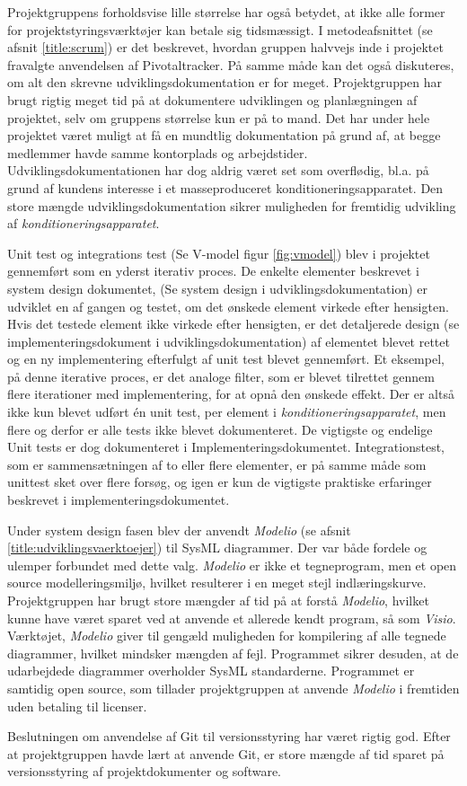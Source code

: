 Projektgruppens forholdsvise lille størrelse har også betydet, at ikke alle former for projektstyringsværktøjer kan betale sig tidsmæssigt. I metodeafsnittet (se afsnit \ref{title:scrum}) er det beskrevet, hvordan gruppen halvvejs inde i projektet fravalgte anvendelsen af Pivotaltracker. På samme måde kan det også diskuteres, om alt den skrevne udviklingsdokumentation er for meget. Projektgruppen har brugt rigtig meget tid på at dokumentere udviklingen og planlægningen af projektet, selv om gruppens størrelse kun er på to mand. Det har under hele projektet været muligt at få en mundtlig dokumentation på grund af, at begge medlemmer havde samme kontorplads og arbejdstider.
Udviklingsdokumentationen har dog aldrig været set som overflødig, bl.a. på grund af kundens interesse i et masseproduceret konditioneringsapparatet. Den store mængde udviklingsdokumentation sikrer muligheden for fremtidig udvikling af \textit{konditioneringsapparatet}. 

Unit test og integrations test (Se V-model figur \ref{fig:vmodel}) blev i projektet gennemført som en yderst iterativ proces. De enkelte elementer beskrevet i system design dokumentet, (Se system design i udviklingsdokumentation) er udviklet en af gangen og testet, om det ønskede element virkede efter hensigten. Hvis det testede element ikke virkede efter hensigten, er det detaljerede design (se implementeringsdokument i udviklingsdokumentation) af elementet blevet rettet og en ny implementering efterfulgt af unit test blevet gennemført. Et eksempel, på denne iterative proces, er det analoge filter, som er blevet tilrettet gennem flere iterationer med implementering, for at opnå den ønskede effekt. Der er altså ikke kun blevet udført én unit test, per element i \textit{konditioneringsapparatet}, men flere og derfor er alle tests ikke blevet dokumenteret. De vigtigste og endelige Unit tests er dog dokumenteret i Implementeringsdokumentet. Integrationstest, som er sammensætningen af to eller flere elementer, er på samme måde som unittest sket over flere forsøg, og igen er kun de vigtigste praktiske erfaringer beskrevet i implementeringsdokumentet.

Under system design fasen blev der anvendt \textit{Modelio} (se afsnit \ref{title:udviklingsvaerktoejer}) til SysML diagrammer. Der var både fordele og ulemper forbundet med dette valg. \textit{Modelio} er ikke et tegneprogram, men et open source modelleringsmiljø, hvilket resulterer i en meget stejl indlæringskurve. Projektgruppen har brugt store mængder af tid på at forstå \textit{Modelio}, hvilket kunne have været sparet ved at anvende et allerede kendt program, så som \textit{Visio}. Værktøjet, \textit{Modelio} giver til gengæld muligheden for kompilering af alle tegnede diagrammer, hvilket mindsker mængden af fejl. Programmet sikrer desuden, at de udarbejdede diagrammer overholder SysML standarderne. Programmet er samtidig open source, som tillader projektgruppen at anvende \textit{Modelio} i fremtiden uden betaling til licenser.

Beslutningen om anvendelse af Git til versionsstyring har været rigtig god. Efter at projektgruppen havde lært at anvende Git, er store mængde af tid sparet på versionsstyring af projektdokumenter og software.

